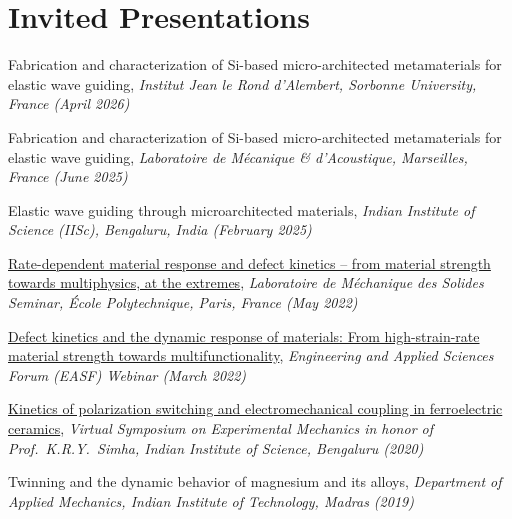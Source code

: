 \documentclass[a4paper,10pt, oneside]{article}
\begin{document}
	\section*{{Invited Presentations}}
	\begin{enumerate}[label={[\arabic*]}, leftmargin=*]
		\itemsep 5pt
		\item Fabrication and characterization of Si-based
		micro-architected metamaterials for elastic wave guiding, \textit{Institut Jean le Rond d'Alembert, Sorbonne University, France (April 2026)}
		\item Fabrication and characterization of Si-based
		micro-architected metamaterials for elastic wave guiding, \textit{Laboratoire de M{\'e}canique \emph{\&} d'Acoustique, Marseilles, France (June 2025)}
		\item Elastic wave guiding through microarchitected materials, \textit{Indian Institute of Science (IISc), Bengaluru, India (February 2025)}
		\item \href{https://www.youtube.com/watch?v=YmLRJPUaMiw}{Rate-dependent material response and defect kinetics -- from material strength towards multiphysics, at the extremes}, \textit{Laboratoire de M\'{e}chanique des Solides Seminar, \'{E}cole Polytechnique, Paris, France (May 2022)} \label{ecole2022}
		\item \href{https://www.youtube.com/watch?v=KJaa1TNWZrM&t=2661s}{Defect kinetics and the dynamic response of materials: From high-strain-rate material strength towards multifunctionality}, \textit{Engineering and Applied Sciences Forum (EASF) Webinar (March 2022)} \label{easf2022}
		\item \href{https://www.youtube.com/watch?v=U4-B_NNvWPY&ab_channel=IIScMechanicalEngineering}{Kinetics of polarization switching and electromechanical coupling in ferroelectric ceramics},\textit{ Virtual Symposium on Experimental Mechanics in honor of Prof.~K.R.Y.~Simha, Indian Institute of Science, Bengaluru (2020)} \label{iiscsimha2020}
		\item Twinning and the dynamic behavior of magnesium and its alloys, \textit{Department of Applied Mechanics, Indian Institute of Technology, Madras (2019)} \label{iitm2019}
	\end{enumerate}
	
\end{document}
